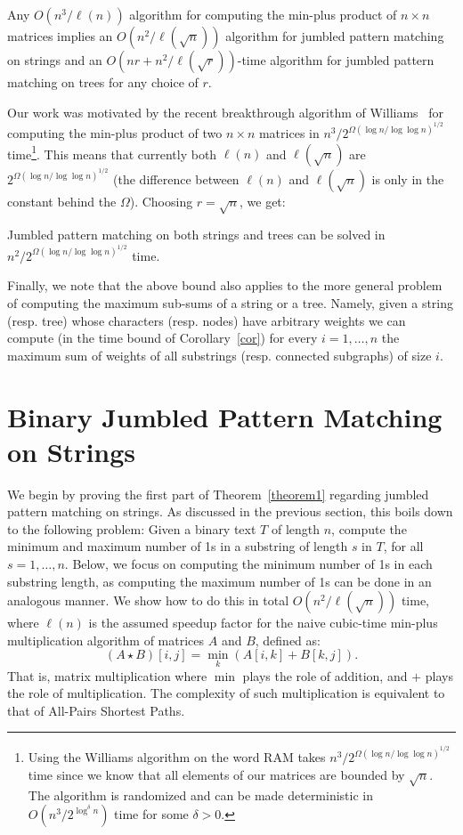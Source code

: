 \documentclass[11pt]{llncs}
\begin{document}
\begin{theorem}\label{theorem1}
Any $O(n^3/\ell(n))$ algorithm for computing the min-plus product of $n\times n$ matrices implies an
 $O(n^2/\ell(\sqrt{n}))$ algorithm for jumbled pattern matching on strings and an $O(nr+ n^2/\ell(\sqrt{r}))$-time algorithm for  jumbled pattern matching on trees for any choice of $r$.
\end{theorem}

\noindent Our work was motivated by the recent breakthrough algorithm of Williams~\cite{Ryan} for computing the min-plus product of two $n\times n$ matrices in $n^3/2^{\Omega(\log n/\log \log n)^{1/2}}$ time\footnote{Using the Williams algorithm on the word RAM takes $n^3/2^{\Omega(\log n/\log \log n)^{1/2}}$ time since we know that all elements of our matrices are bounded by $\sqrt{n}$. The algorithm is randomized and can be made deterministic  in $O(n^3/2^{\log^{\delta} n})$ time for some $\delta > 0$.}. This means that currently both $\ell(n)$ and  $\ell(\sqrt{n})$ are $2^{\Omega(\log n/\log \log n)^{1/2}}$ (the difference between $\ell(n)$ and  $\ell(\sqrt{n})$ is only in the constant behind the $\Omega$). Choosing $r= \sqrt{n}$, we get:

\begin{corollary}\label{cor}
Jumbled pattern matching on both strings and trees can be solved in $n^2/2^{\Omega(\log n/\log \log n)^{1/2}}$ time.
 \end{corollary}

\noindent Finally, we note that the above bound also applies to the more general problem of computing the maximum sub-sums  of a string or a tree. Namely, given a string (resp. tree) whose characters (resp. nodes) have arbitrary weights we can compute (in the time bound of Corollary~\ref{cor}) for every $i=1,\ldots,n$ the maximum sum of weights of all substrings (resp. connected subgraphs) of size $i$.




\section{Binary Jumbled Pattern Matching on Strings}

We begin by proving the first part of Theorem~\ref{theorem1} regarding jumbled pattern matching on strings. As discussed in the previous section, this boils down to the following problem: Given a binary text $T$ of length $n$, compute the minimum and maximum number of 1s in a substring of length $s$ in $T$, for all $s=1,\ldots,n$. Below, we focus on computing the minimum number of 1s in each substring length, as computing the maximum number of 1s can be done in an analogous manner. We show how to do this in total $O(n^2/\ell(\sqrt{n}))$ time, where $\ell(n)$ is the assumed speedup factor for the naive cubic-time min-plus multiplication algorithm of matrices $A$ and $B$, defined as:  \[(A \star B)[i,j] = \min_{k} (A[i,k] + B[k,j]).\]
That is, matrix multiplication where $\min$ plays the role of addition, and $+$ plays the role of multiplication.
The  complexity of  such multiplication is equivalent to that of All-Pairs Shortest Paths.
\end{document}
